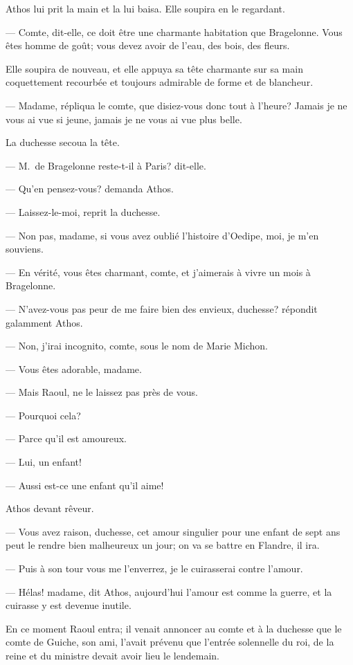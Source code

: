 Athos lui prit la main et la lui baisa. Elle soupira en le regardant.

— Comte, dit-elle, ce doit être une charmante habitation que Bragelonne. Vous êtes homme de goût; vous devez avoir de l'eau, des bois, des fleurs.

Elle soupira de nouveau, et elle appuya sa tête charmante sur sa main coquettement recourbée et toujours admirable de forme et de blancheur.

— Madame, répliqua le comte, que disiez-vous donc tout à l'heure? Jamais je ne vous ai vue si jeune, jamais je ne vous ai vue plus belle.

La duchesse secoua la tête.

— M.~de Bragelonne reste-t-il à Paris? dit-elle.

— Qu'en pensez-vous? demanda Athos.

— Laissez-le-moi, reprit la duchesse.

— Non pas, madame, si vous avez oublié l'histoire d'Oedipe, moi, je m'en souviens.

— En vérité, vous êtes charmant, comte, et j'aimerais à vivre un mois à Bragelonne.

— N'avez-vous pas peur de me faire bien des envieux, duchesse? répondit galamment Athos.

— Non, j'irai incognito, comte, sous le nom de Marie Michon.

— Vous êtes adorable, madame.

— Mais Raoul, ne le laissez pas près de vous.

— Pourquoi cela?

— Parce qu'il est amoureux.

— Lui, un enfant!

— Aussi est-ce une enfant qu'il aime!

Athos devant rêveur.

— Vous avez raison, duchesse, cet amour singulier pour une enfant de sept ans peut le rendre bien malheureux un jour; on va se battre en Flandre, il ira.

— Puis à son tour vous me l'enverrez, je le cuirasserai contre l'amour.

— Hélas! madame, dit Athos, aujourd'hui l'amour est comme la guerre, et la cuirasse y est devenue inutile.

En ce moment Raoul entra; il venait annoncer au comte et à la duchesse que le comte de Guiche, son ami, l'avait prévenu que l'entrée solennelle du roi, de la reine et du ministre devait avoir lieu le lendemain.

